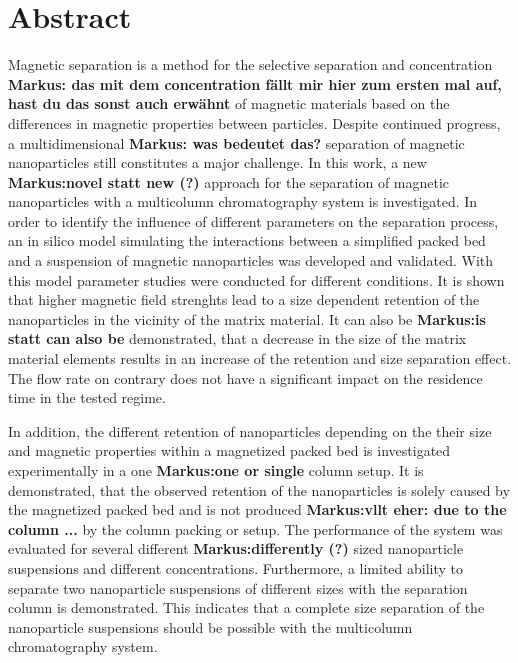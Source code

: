 \chapter{Abstract}
\label{ch:abstract_en}

Magnetic separation is a method for the selective separation and concentration \textbf{Markus: das mit dem concentration fällt mir hier zum ersten mal auf, hast du das sonst auch erwähnt} of magnetic materials based on the differences in magnetic properties between particles. Despite continued progress, a multidimensional \textbf{Markus: was bedeutet das?} separation of magnetic nanoparticles still constitutes a major challenge. In this work, a new \textbf{Markus:novel statt new (?)} approach for the separation of magnetic nanoparticles with a multicolumn chromatography system is investigated. In order to identify the influence of different parameters on the separation process, an in silico model simulating the interactions between a simplified packed bed and a suspension of magnetic nanoparticles was developed and validated. With this model parameter studies were conducted for different conditions. It is shown that higher magnetic field strenghts lead to a size dependent retention of the nanoparticles in the vicinity of the matrix material. It can also be \textbf{Markus:is statt can also be} demonstrated, that a decrease in the size of the matrix material elements results in an increase of the retention and size separation effect. The flow rate on contrary does not have a significant impact on the residence time in the tested regime.  

In addition, the different retention of nanoparticles depending on the their size and magnetic properties within a magnetized packed bed is investigated experimentally in a one \textbf{Markus:one or single} column setup. It is demonstrated, that the observed retention of the nanoparticles is solely caused by the magnetized packed bed and is not produced \textbf{Markus:vllt eher: due to the column ...}  by the column packing or setup. The performance of the system was evaluated for several different \textbf{Markus:differently (?)}  sized nanoparticle suspensions and different concentrations. Furthermore, a limited ability to separate two nanoparticle suspensions of different sizes with the separation column is demonstrated. This indicates that a complete size separation of the nanoparticle suspensions should be possible with the multicolumn chromatography system. 

